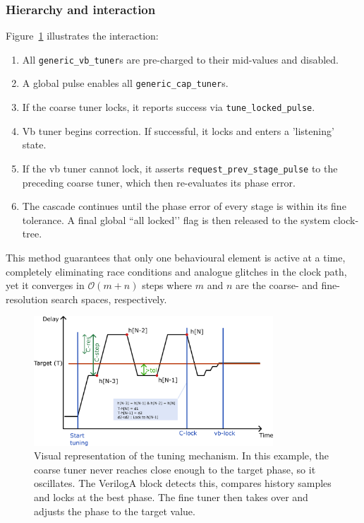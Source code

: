 \subsubsection{Hierarchy and interaction}
Figure~\ref{fig:tuning_hierarchy} illustrates the interaction:

\begin{enumerate}
  \item All \texttt{generic\_vb\_tuner}s are pre-charged to their
        mid-values and disabled.
  \item A global pulse enables all \texttt{generic\_cap\_tuner}s.
  \item If the coarse tuner locks, it reports success via \texttt{tune\_locked\_pulse}.
  \item Vb tuner begins correction. If successful, it locks and enters a 'listening' state.
  \item If the vb tuner cannot lock, it asserts \texttt{request\_prev\_stage\_pulse} to
        the preceding coarse tuner, which then re-evaluates its phase error.
  \item The cascade continues until the phase error of every stage is within its
        fine tolerance. A final global ``all locked’’ flag is then released to the
        system clock-tree.
\end{enumerate}

This method guarantees that only one behavioural element is active at a
time, completely eliminating race conditions and analogue glitches in the clock
path, yet it converges in $\mathcal{O}(m+n)$ steps where
\(m\) and \(n\) are the coarse- and fine-resolution search spaces, respectively.

\begin{figure}[H]
  \centering
  \includegraphics[width=0.8\textwidth]{figures/Schematics/Tuning_principle.png}
  \caption{Visual representation of the tuning mechanism. In this example, the coarse tuner never reaches close enough to the target phase, so it oscillates. The VerilogA block detects this, compares history samples and locks at the best phase. The fine tuner then takes over and adjusts the phase to the target value.}
  \label{fig:tuning_hierarchy}
\end{figure}


